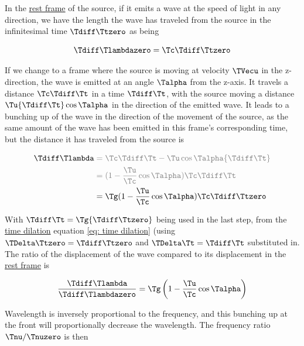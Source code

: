 In the \hyperlink{def-proper-frame}{rest frame} of the source, if it emits a wave at the speed of light in any direction, we have the length the wave has traveled from the source in the infinitesimal time ${\Tdiff \Ttzero }$ as being

\begin{equation}
	{\Tdiff \Tlambdazero } = {\Tc }{\Tdiff \Ttzero }
\end{equation}

If we change to a frame where the source is moving at velocity ${\TVecu  }$ in the z-direction, the wave is emitted at an angle $\Talpha $ from the z-axis.
It travels a distance ${\Tc }{\Tdiff \Tt }$ in a time ${\Tdiff \Tt }$, with the source moving a distance $ \Tu  {\Tdiff \Tt } \cos\Talpha  $ in the direction of the emitted wave.
It leads to a bunching up of the wave in the direction of the movement of the source, as the same amount of the wave has been emitted in this frame's corresponding time, but the distance it has traveled from the source is

\begin{equation}
	\begin{aligned}
		{\Tdiff \Tlambda } & \color{gray}= {\Tc }{\Tdiff \Tt }-{\Tu } \cos\Talpha  {\Tdiff \Tt }   \\
		           & \color{gray}=  (1-\frac{\Tu }{\Tc }\cos\Talpha )\Tc \Tdiff \Tt  \\
		           & = \Tg  (1-\frac{\Tu }{\Tc }\cos\Talpha )\Tc \Tdiff \Ttzero    \\
	\end{aligned}
\end{equation}

With ${\Tdiff \Tt } = \Tg  {\Tdiff \Ttzero }$ being used in the last step, from the \hyperlink{def-time-dilation}{time dilation} equation \eqref{eq: time dilation} (using $\TDelta \Ttzero = \Tdiff \Ttzero$ and $\TDelta \Tt = \Tdiff \Tt$ substituted in.
The ratio of the displacement of the wave compared to its displacement in the \hyperlink{def-proper-frame}{rest frame} is

\begin{equation}
	\frac{\Tdiff \Tlambda }{\Tdiff \Tlambdazero } = \Tg  \left(1-\dfrac{\Tu }{\Tc } \cos\Talpha  \right)
\end{equation}

Wavelength is inversely proportional to the frequency, and this bunching up at the front will proportionally decrease the wavelength.
The frequency ratio $\Tnu /\Tnuzero $ is then

